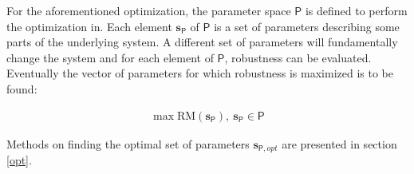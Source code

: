     For the aforementioned optimization, the parameter space $\mathsf{P}$ is defined to perform the optimization in. Each element $\mathbf{s}_{\mathsf{P}}$ of $\mathsf{P}$ is a set of parameters describing some parts of the underlying system. A different set of parameters will fundamentally change the system and for each element of $\mathsf{P}$, robustness can be evaluated. Eventually the vector of parameters for which robustness is maximized is to be found:

    \begin{gather}\label{eq:10} \max \text{RM}(\mathbf{s}_{\mathsf{P}}),\ \mathbf{s}_{\mathsf{P}}  \in \mathsf{P}\end{gather}

    Methods on finding the optimal set of parameters $\mathbf{s}_{\mathsf{P},opt}$ are presented in section \ref{opt}.









